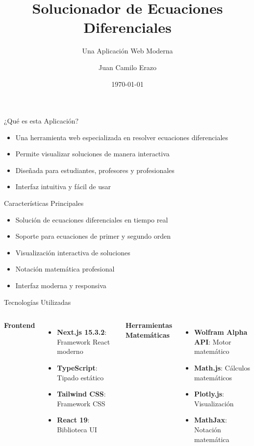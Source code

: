 \documentclass[aspectratio=169]{beamer}
\title{Solucionador de Ecuaciones Diferenciales}
\subtitle{Una Aplicación Web Moderna}
\author{Juan Camilo Erazo}
\date{\today}
\begin{document}
\begin{frame}
    \titlepage
\end{frame}

\begin{frame}{¿Qué es esta Aplicación?}
    \begin{itemize}
        \item Una herramienta web especializada en resolver ecuaciones diferenciales
        \item Permite visualizar soluciones de manera interactiva
        \item Diseñada para estudiantes, profesores y profesionales
        \item Interfaz intuitiva y fácil de usar
    \end{itemize}
\end{frame}

\begin{frame}{Características Principales}
    \begin{itemize}
        \item Solución de ecuaciones diferenciales en tiempo real
        \item Soporte para ecuaciones de primer y segundo orden
        \item Visualización interactiva de soluciones
        \item Notación matemática profesional
        \item Interfaz moderna y responsiva
    \end{itemize}
\end{frame}

\begin{frame}{Tecnologías Utilizadas}
    \begin{columns}
        \textbf{Frontend}
        \begin{itemize}
            \item \textbf{Next.js 15.3.2}: Framework React moderno
            \item \textbf{TypeScript}: Tipado estático
            \item \textbf{Tailwind CSS}: Framework CSS
            \item \textbf{React 19}: Biblioteca UI
        \end{itemize}
        
        \textbf{Herramientas Matemáticas}
        \begin{itemize}
            \item \textbf{Wolfram Alpha API}: Motor matemático
            \item \textbf{Math.js}: Cálculos matemáticos
            \item \textbf{Plotly.js}: Visualización
            \item \textbf{MathJax}: Notación matemática
        \end{itemize}
    \end{columns}
\end{frame}
\end{document}
